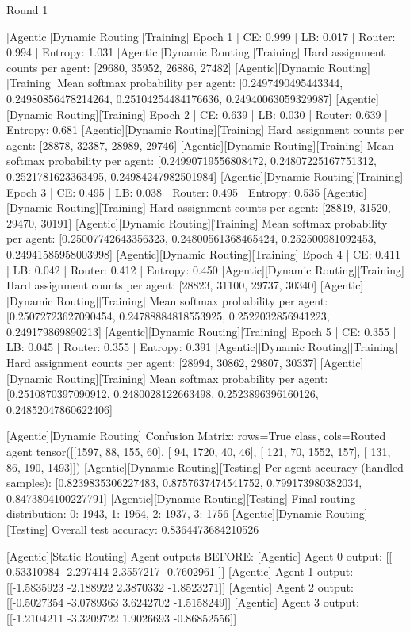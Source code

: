 Round 1

[Agentic][Dynamic Routing][Training] Epoch 1 | CE: 0.999 | LB: 0.017 | Router: 0.994 | Entropy: 1.031
[Agentic][Dynamic Routing][Training] Hard assignment counts per agent: [29680, 35952, 26886, 27482]
[Agentic][Dynamic Routing][Training] Mean softmax probability per agent: [0.2497490495443344, 0.24980856478214264, 0.25104254484176636, 0.24940063059329987]
[Agentic][Dynamic Routing][Training] Epoch 2 | CE: 0.639 | LB: 0.030 | Router: 0.639 | Entropy: 0.681
[Agentic][Dynamic Routing][Training] Hard assignment counts per agent: [28878, 32387, 28989, 29746]
[Agentic][Dynamic Routing][Training] Mean softmax probability per agent: [0.24990719556808472, 0.24807225167751312, 0.2521781623363495, 0.24984247982501984]
[Agentic][Dynamic Routing][Training] Epoch 3 | CE: 0.495 | LB: 0.038 | Router: 0.495 | Entropy: 0.535
[Agentic][Dynamic Routing][Training] Hard assignment counts per agent: [28819, 31520, 29470, 30191]
[Agentic][Dynamic Routing][Training] Mean softmax probability per agent: [0.25007742643356323, 0.24800561368465424, 0.252500981092453, 0.24941585958003998]
[Agentic][Dynamic Routing][Training] Epoch 4 | CE: 0.411 | LB: 0.042 | Router: 0.412 | Entropy: 0.450
[Agentic][Dynamic Routing][Training] Hard assignment counts per agent: [28823, 31100, 29737, 30340]
[Agentic][Dynamic Routing][Training] Mean softmax probability per agent: [0.25072723627090454, 0.24788884818553925, 0.2522032856941223, 0.249179869890213]
[Agentic][Dynamic Routing][Training] Epoch 5 | CE: 0.355 | LB: 0.045 | Router: 0.355 | Entropy: 0.391
[Agentic][Dynamic Routing][Training] Hard assignment counts per agent: [28994, 30862, 29807, 30337]
[Agentic][Dynamic Routing][Training] Mean softmax probability per agent: [0.2510870397090912, 0.2480028122663498, 0.2523896396160126, 0.24852047860622406]

[Agentic][Dynamic Routing] Confusion Matrix: rows=True class, cols=Routed agent
tensor([[1597,   88,  155,   60],
[  94, 1720,   40,   46],
[ 121,   70, 1552,  157],
[ 131,   86,  190, 1493]])
[Agentic][Dynamic Routing][Testing] Per-agent accuracy (handled samples): [0.8239835306227483, 0.8757637474541752, 0.799173980382034, 0.8473804100227791]
[Agentic][Dynamic Routing][Testing] Final routing distribution: {0: 1943, 1: 1964, 2: 1937, 3: 1756}
[Agentic][Dynamic Routing][Testing] Overall test accuracy: 0.8364473684210526

[Agentic][Static Routing] Agent outputs BEFORE:
[Agentic] Agent 0 output: [[ 0.53310984 -2.297414    2.3557217  -0.7602961 ]]
[Agentic] Agent 1 output: [[-1.5835923 -2.188922   2.3870332 -1.8523271]]
[Agentic] Agent 2 output: [[-0.5027354 -3.0789363  3.6242702 -1.5158249]]
[Agentic] Agent 3 output: [[-1.2104211  -3.3209722   1.9026693  -0.86852556]]

